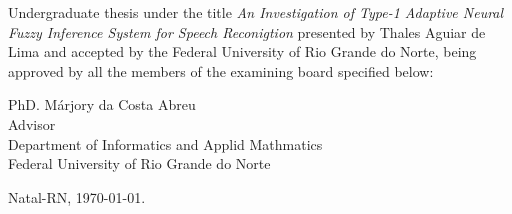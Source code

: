 \begin{folhadeaprovacao}
	\setlength{\ABNTsignthickness}{0.4pt}
	\setlength{\ABNTsignwidth}{10cm}
	
	\noindent 
    Undergraduate thesis under the title {\it An Investigation of Type-1 Adaptive Neural Fuzzy Inference System for Speech Reconigtion} presented by Thales Aguiar de Lima and accepted by the Federal University of Rio Grande do Norte, being approved by all the members of the examining board specified below:
		
	\assinatura
	{
		PhD. Márjory da Costa Abreu\\
		{\small Advisor} 															\\ 
		{\footnotesize
			Department of Informatics and Applid Mathmatics																\\
		  	Federal University of Rio Grande do Norte
		}
	}
	
		
	\vfill
	
	\begin{center}
		Natal-RN, \today.
	\end{center}
\end{folhadeaprovacao}